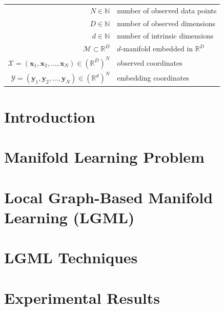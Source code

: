 \documentclass[12pt]{article}
\newcommand{\mani}{\mathcal{M}}
\newcommand{\N}{\mathbb{N}}
\newcommand{\RD}{\mathbb{R}^D}
\newcommand{\Rd}{\mathbb{R}^d}
\newcommand{\X}{\mathcal{X}}
\newcommand{\Y}{\mathcal{Y}}
\begin{document}
\begin{tabular}{rl}
  $N \in \N$ & number of observed data points \\
  $D \in \N$ & number of observed dimensions \\
  $d \in \N$ & number of intrinsic dimensions\\
  $\mani \subset \RD$ & $d$-manifold embedded in $\RD$ \\
  $\X = (\bm{x}_1, \bm{x}_2, ..., \bm{x}_N) \in (\RD)^N$ & observed
  coordinates \\
  $\Y = (\bm{y}_1, \bm{y}_2, ..., \bm{y}_N) \in (\Rd)^N$ & embedding
  coordinates
\end{tabular}

\newpage

\listoffigures
\newpage


    
\section{Introduction}
\label{intro}


\section{Manifold Learning Problem}
\label{math}


\section{Local Graph-Based Manifold Learning (LGML)}
\label{lgml}


\section{LGML Techniques}
\label{techniques}


% 

\section{Experimental Results}
\label{experiment}

\end{document}
